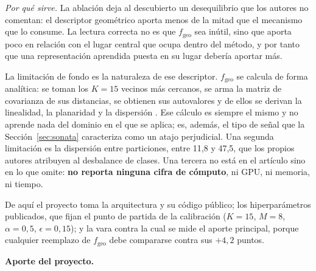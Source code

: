 \emph{Por qué sirve.} La ablación deja al descubierto un desequilibrio que los
autores no comentan: el descriptor geométrico aporta menos de la mitad que el
mecanismo que lo consume. La lectura correcta no es que $f_{\text{geo}}$ sea
inútil, sino que aporta poco en relación con el lugar central que ocupa dentro
del método, y por tanto que una representación aprendida puesta en su lugar
debería aportar más.

La limitación de fondo es la naturaleza de ese descriptor. $f_{\text{geo}}$ se
calcula de forma analítica: se toman los $K=15$ vecinos más cercanos, se arma la
matriz de covarianza de sus distancias, se obtienen sus autovalores y de ellos se
derivan la linealidad, la planaridad y la dispersión \cite{zhang2026hyperncd}.
Ese cálculo es siempre el mismo y no aprende nada del dominio en el que se
aplica; es, además, el tipo de señal que la Sección~\ref{sec:sonata} caracteriza
como un atajo perjudicial. Una segunda limitación es la dispersión entre
particiones, entre 11,8 y 47,5, que los propios autores atribuyen al desbalance
de clases. Una tercera no está en el artículo sino en lo que omite: \textbf{no
reporta ninguna cifra de cómputo}, ni GPU, ni memoria, ni tiempo.

De aquí el proyecto toma la arquitectura y su código público; los
hiperparámetros publicados, que fijan el punto de partida de la calibración
($K=15$, $M=8$, $\alpha=0{,}5$, $\epsilon=0{,}15$); y la vara contra la cual se
mide el aporte principal, porque cualquier reemplazo de $f_{\text{geo}}$ debe
compararse contra sus $+4{,}2$ puntos.

\textbf{Aporte del proyecto.}

